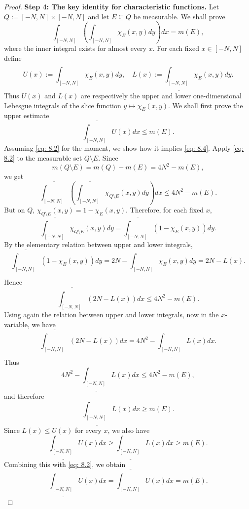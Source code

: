\begin{proof}
\textbf{Step 4: The key identity for characteristic functions.}
Let $Q:=[-N,N]\times[-N,N]$ and let $E\subseteq Q$ be measurable. We shall prove
\begin{equation} \label{eq: 8.4}
    \int_{[-N,N]}\left(\int_{[-N,N]}\chi_{E}(x,y)dy\right)dx=m(E),
\end{equation}
where the inner integral exists for almost every $x$. For each fixed $x\in[-N,N]$ define
$$U(x):=\overline{\int_{[-N,N]}}\chi_{E}(x,y)dy, \quad L(x):=\underline{\int_{[-N,N]}}\chi_{E}(x,y)dy.$$
Thus $U(x)$ and $L(x)$ are respectively the upper and lower one-dimensional Lebesgue integrals of the slice function $y\mapsto\chi_{E}(x,y)$. We shall first prove the upper estimate
\begin{equation} \label{eq: 8.2}
    \overline{\int_{[-N,N]}} U(x)dx\le m(E).
\end{equation}
Assuming \autoref{eq: 8.2}  for the moment, we show how it implies \autoref{eq: 8.4}. 
Apply \autoref{eq: 8.2} to the measurable set $Q\setminus E$. Since
\[
    m(Q\setminus E)=m(Q)-m(E)=4N^{2}-m(E),
\]
we get
\[
    \overline{\int_{[-N,N]}}\left(\overline{\int_{[-N,N]}}\chi_{Q\setminus E}(x,y)dy\right)dx\le 4N^{2}-m(E).
\]
But on $Q$, $\chi_{Q\setminus E}(x,y)=1-\chi_{E}(x,y)$. Therefore, for each fixed $x$,
\[
    \overline{\int_{[-N,N]}}\chi_{Q\setminus E}(x,y)dy=\overline{\int_{[-N,N]}}(1-\chi_{E}(x,y))dy.
\]
By the elementary relation between upper and lower integrals,
\[
    \overline{\int_{[-N,N]}} (1-\chi_{E}(x,y))dy=2N-\underline{\int_{[-N,N]}}\chi_{E}(x,y)dy=2N-L(x).
\]
Hence
\[
    \overline{\int_{[-N,N]}}(2N-L(x))dx\le 4N^{2}-m(E).
\]
Using again the relation between upper and lower integrals, now in the $x$-variable, we have
\[
    \overline{\int_{[-N,N]}} (2N-L(x))dx=4N^{2}-\underline{\int_{[-N,N]}}L(x)dx .
\]
Thus
\[
    4N^{2}-\underline{\int_{[-N,N]}}L(x)dx\le 4N^{2}-m(E),
\]
and therefore 
\[
    \underline{\int_{[-N,N]}} L(x)dx\ge m(E).
\]
Since $L(x)\le U(x)$ for every $x$, we also have
\[
    \underline{\int_{[-N,N]}}U(x)dx\ge\underline{\int_{[-N,N]}}L(x)dx\ge m(E).
\]
Combining this with \autoref{eq: 8.2}, we obtain
\[
    \underline{\int_{[-N,N]}} U(x)dx=\overline{\int_{[-N,N]}}U(x)dx=m(E).
\]


\end{proof}
